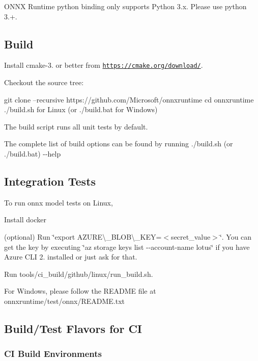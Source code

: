 O\+N\+NX Runtime python binding only supports Python 3.\+x. Please use python 3.+.

\subsection*{Build}

Install cmake-\/3. or better from \href{https://cmake.org/download/}{\tt https\+://cmake.\+org/download/}.

Checkout the source tree\+: 
\begin{DoxyCode}
git clone --recursive https://github.com/Microsoft/onnxruntime
cd onnxruntime
./build.sh for Linux (or ./build.bat for Windows)
\end{DoxyCode}
 The build script runs all unit tests by default.

The complete list of build options can be found by running {\ttfamily ./build.sh (or ./build.bat) -\/-\/help}

\subsection*{Integration Tests}

To run onnx model tests on Linux,


\begin{DoxyEnumerate}
\item Install docker
\item (optional) Run \char`\"{}export A\+Z\+U\+R\+E\textbackslash{}\+\_\+\+B\+L\+O\+B\textbackslash{}\+\_\+\+K\+E\+Y=$<$secret\+\_\+value$>$\char`\"{}. You can get the key by executing \char`\"{}az storage keys list -\/-\/account-\/name lotus\char`\"{} if you have Azure C\+LI 2. installed or just ask for that.
\item Run tools/ci\+\_\+build/github/linux/run\+\_\+build.\+sh.
\end{DoxyEnumerate}

For Windows, please follow the R\+E\+A\+D\+ME file at onnxruntime/test/onnx/\+R\+E\+A\+D\+M\+E.\+txt

\subsection*{Build/\+Test Flavors for CI}

\subsubsection*{CI Build Environments}

